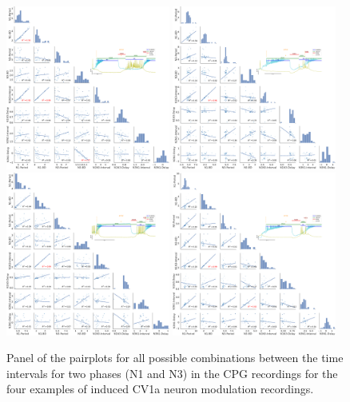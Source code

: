 \begin{figure}[htbp]
	\centering
	\includegraphics[width=0.48\textwidth]{./img/invariants/data/SUSSEX/CV1a_driven1/images/2phases/panel_with_pairplot.pdf}
	\includegraphics[width=0.48\textwidth]{./img/invariants/data/SUSSEX/CV1a_driven2/images/panel_with_pairplot.pdf}
	\includegraphics[width=0.48\textwidth]{./img/invariants/data/SUSSEX/CV1a_driven4/images/2phases/panel_with_pairplot.pdf}
	\includegraphics[width=0.48\textwidth]{./img/invariants/data/SUSSEX/CV1a_driven3/images/panel_with_pairplot.pdf}
	\caption{Panel of the pairplots for all possible combinations between the time intervals for two phases (N1 and N3) in the CPG recordings for the four examples of induced CV1a neuron modulation recordings.}
	\label{fig:cv1a pairplot comparison}
\end{figure}


